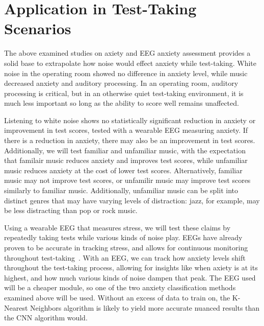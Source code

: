\documentclass[journal]{IEEEtran}
\begin{document}
\section{Application in Test-Taking Scenarios}
The above examined studies on axiety and EEG anxiety assessment provides a solid base to extrapolate how noise would effect anxiety while test-taking. White noise in the operating room showed no difference in anxiety level, while music decreased anxiety and auditory processing\cite{ShahrokhiShabnam2022Teow, WayT.JustinMD2013EoNo}. In an operating room, auditory processing is critical, but in an otherwise quiet test-taking environment, it is much less important so long as the ability to score well remains unaffected.

Listening to white noise shows no statistically significant reduction in anxiety or improvement in test scores, tested with a wearable EEG measuring anxiety. If there is a reduction in anxiety, there may also be an improvement in test scores. Additionally, we will test familiar and unfamiliar music, with the expectation that familair music reduces anxiety and improves test scores, while unfamiliar music reduces anxiety at the cost of lower test scores. Alternatively, familiar music may not improve test scores, or unfamilir music may improve test scores similarly to familiar music. Additionally, unfamiliar music can be split into distinct genres that may have varying levels of distraction: jazz, for example, may be less distracting than pop or rock music.

Using a wearable EEG that measures stress, we will test these claims by repeatedly taking tests while various kinds of noise play. EEGs have already proven to be accurate in tracking stress, and allows for continuous monitoring throughout test-taking~\cite{ChatterjeeDebatri2023Doms}. With an EEG, we can track how anxiety levels shift throughout the test-taking process, allowing for insights like when axiety is at its highest, and how much various kinds of noise dampen that peak. The EEG used will be a cheaper module, so one of the two anxiety classification methods examined above will be used. Without an excess of data to train on, the K-Nearest Neighbors algorithm is likely to yield more accurate nuanced results than the CNN algorithm would.
\end{document}
